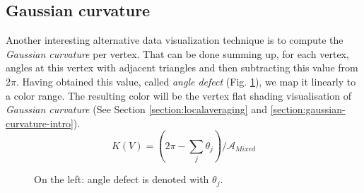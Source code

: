 \subsection{Gaussian curvature}
\label{section:vertex-area-gaussian-curvature}
Another interesting alternative data visualization technique is to compute the \textit{Gaussian curvature} per vertex. That can be done summing up, for each vertex, angles at this vertex with adjacent triangles and then subtracting this value from $2\pi$.
Having obtained this value, called \textit{angle defect} (Fig. \ref{fig:gc-angle}), we map it linearly to a color range.
The resulting color will be the vertex flat shading visualisation of \textit{Gaussian curvature} (See Section \ref{section:localaveraging} and \ref{section:gaussian-curvature-intro}).
$$K(V) = (2\pi - \sum_j \theta_j)/\mathcal{A}_{Mixed}$$
\begin{figure}[!h]
    \centering
    \caption{On the left: angle defect is denoted with $\theta_j$.}\label{fig:gc-angle}
\end{figure}

